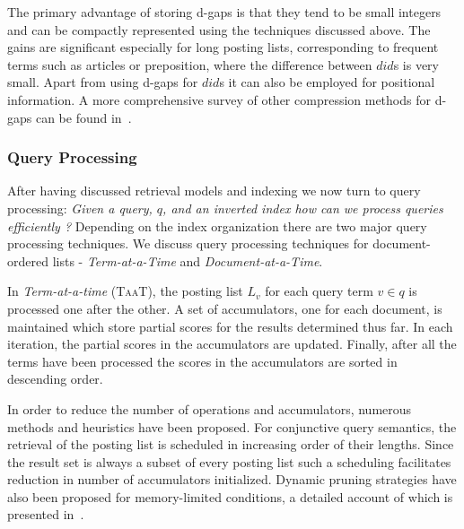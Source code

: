 The primary advantage of storing d-gaps is that they tend to be small integers and can be compactly represented using the techniques discussed above. The gains are significant especially for long posting lists, corresponding to frequent terms such as articles or preposition, where the difference between $did$s is very small. Apart from using d-gaps for $did$s it can also be employed for positional information. A more comprehensive survey of other compression methods for d-gaps can be found in~\cite{Witten:1999fk}. 

\subsubsection{Query Processing}

After having discussed retrieval models and indexing we now turn to query processing: \emph{Given a query, $q$, and an inverted index how can we process queries efficiently ?} Depending on the index organization there are two major query processing techniques. We discuss query processing techniques for document-ordered lists - \emph{Term-at-a-Time} and \emph{Document-at-a-Time}.

In \emph{Term-at-a-time} (\textsc{TaaT}), the posting list $L_v$ for each query term $v \in q$ is processed one after the other. A set of accumulators, one for each document, is maintained which store partial scores for the results determined thus far. In each iteration, the partial scores in the accumulators are updated. Finally, after all the terms have been processed the scores in the accumulators are sorted in descending order.

In order to reduce the number of operations and accumulators, numerous methods and heuristics have been proposed. For conjunctive query semantics, the retrieval of the posting list is scheduled in increasing order of their lengths. Since the result set is always a subset of every posting list such a scheduling facilitates reduction in number of accumulators initialized. Dynamic pruning strategies have also been proposed for memory-limited conditions, a detailed account of which is presented in~\cite{baeza2008design}.

